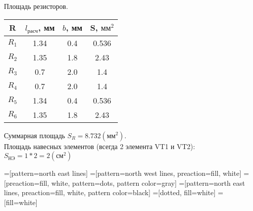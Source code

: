 \documentclass[12pt, a4paper] {ncc}
\begin{document}
    Площадь резисторов.\\

	\begin{tabular}{|c|c|c|c|}
		\hline
            R   & $l_{\text{расч}}$, мм & $b$, мм & S, $\text{мм}^2$ \\ \hline
          $R_1$ & 1.34              	&  0.4    & 0.536 \\ \hline
          $R_2$ & 1.35              	&  1.8    & 2.43  \\ \hline
          $R_3$ & 0.7               	&  2.0    & 1.4  \\ \hline
          $R_4$ & 0.7               	&  2.0    & 1.4  \\ \hline
          $R_5$ & 1.34              	&  0.4    & 0.536  \\ \hline
          $R_6$ & 1.35              	&  1.8    & 2.43 \\ \hline
	\end{tabular}

	Суммарная площадь $S_R = 8.732 (\text{мм}^2)$.\\

	Площадь навесных элементов (всегда 2 элемента VT1 и VT2): $S_{\text{НЭ}} = 1 * 2 = 2 (\text{см}^2)$



=[pattern=north east lines]
=[pattern=north west lines, preaction={fill, white}]
=[preaction={fill, white}, pattern=dots, pattern color=gray]
=[pattern=north east lines, preaction={fill, white},
                   pattern color=black]
=[dotted, fill=white]
=[fill=white]
\end{document}
